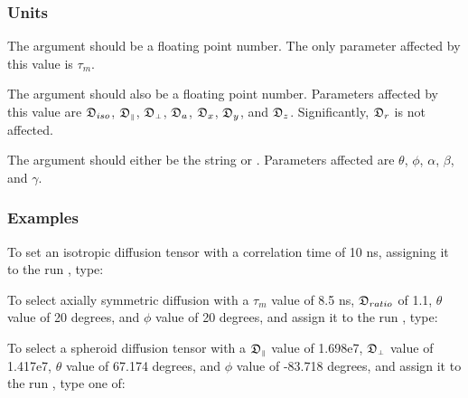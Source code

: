 \subsubsection{Units}

The  argument should be a floating point number.  The only parameter affected by this value is $\tau_m$.


The  argument should also be a floating point number.  Parameters affected by this value are $\mathfrak{D}_{iso}$, $\mathfrak{D}_{\scriptscriptstyle \parallel}$, $\mathfrak{D}_{\scriptscriptstyle \perp}$, $\mathfrak{D}_a$, $\mathfrak{D}_x$, $\mathfrak{D}_y$, and $\mathfrak{D}_z$.  Significantly, $\mathfrak{D}_r$ is not affected.


The  argument should either be the string  or .  Parameters affected are $\theta$, $\phi$, $\alpha$, $\beta$, and $\gamma$.



\subsubsection{Examples}

To set an isotropic diffusion tensor with a correlation time of 10 ns, assigning it to the run , type:






To select axially symmetric diffusion with a $\tau_m$ value of 8.5 ns, $\mathfrak{D}_{ratio}$ of 1.1, $\theta$ value of 20 degrees, and $\phi$ value of 20 degrees, and assign it to the run , type:



To select a spheroid diffusion tensor with a $\mathfrak{D}_{\scriptscriptstyle \parallel}$ value of 1.698e7, $\mathfrak{D}_{\scriptscriptstyle \perp}$ value of 1.417e7, $\theta$ value of 67.174 degrees, and $\phi$ value of -83.718 degrees, and assign it to the run , type one of:


